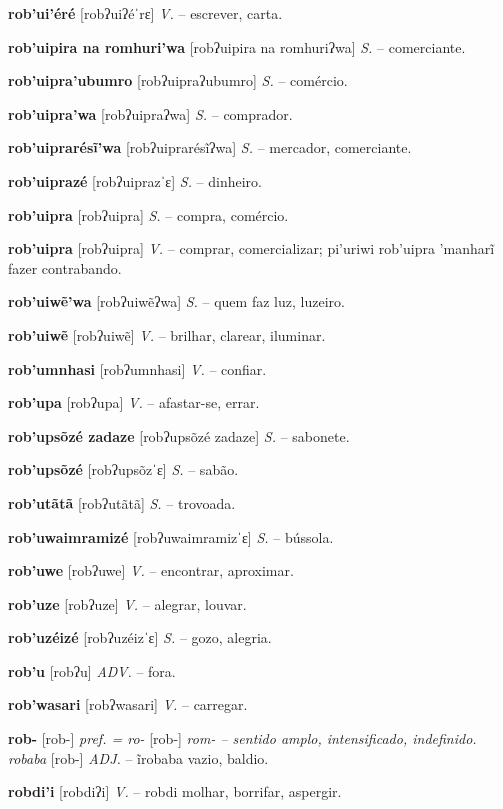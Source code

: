 \textbf{rob'ui'éré} [robʔuiʔéˈrɛ] \textit{V.} -- escrever, carta.

\textbf{rob'uipira na romhuri'wa} [robʔuipira na romhuriʔwa] \textit{S.} -- comerciante.

\textbf{rob'uipra'ubumro} [robʔuipraʔubumro] \textit{S.} -- comércio.

\textbf{rob'uipra'wa} [robʔuipraʔwa] \textit{S.} -- comprador.

\textbf{rob'uiprarésĩ'wa} [robʔuiprarésĩʔwa] \textit{S.} -- mercador, comerciante.

\textbf{rob'uiprazé} [robʔuiprazˈɛ] \textit{S.} -- dinheiro.

\textbf{rob'uipra} [robʔuipra] \textit{S.} -- compra, comércio.

\textbf{rob'uipra} [robʔuipra] \textit{V.} -- comprar, comercializar; pi'uriwi rob'uipra 'manharĩ fazer contrabando.

\textbf{rob'uiwẽ'wa} [robʔuiwẽʔwa] \textit{S.} -- quem faz luz, luzeiro.

\textbf{rob'uiwẽ} [robʔuiwẽ] \textit{V.} -- brilhar, clarear, iluminar.

\textbf{rob'umnhasi} [robʔumnhasi] \textit{V.} -- confiar.

\textbf{rob'upa} [robʔupa] \textit{V.} -- afastar-se, errar.

\textbf{rob'upsõzé zadaze} [robʔupsõzé zadaze] \textit{S.} -- sabonete.

\textbf{rob'upsõzé} [robʔupsõzˈɛ] \textit{S.} -- sabão.

\textbf{rob'utãtã} [robʔutãtã] \textit{S.} -- trovoada.

\textbf{rob'uwaimramizé} [robʔuwaimramizˈɛ] \textit{S.} -- bússola.

\textbf{rob'uwe} [robʔuwe] \textit{V.} -- encontrar, aproximar.

\textbf{rob'uze} [robʔuze] \textit{V.} -- alegrar, louvar.

\textbf{rob'uzéizé} [robʔuzéizˈɛ] \textit{S.} -- gozo, alegria.

\textbf{rob'u} [robʔu] \textit{ADV.} -- fora.

\textbf{rob'wasari} [robʔwasari] \textit{V.} -- carregar.

\textbf{rob-} [rob-] \textit{pref. = ro-} [rob-] \textit{rom- -- sentido amplo, intensificado, indefinido. robaba} [rob-] \textit{ADJ.} -- ĩrobaba vazio, baldio.

\textbf{robdi'i} [robdiʔi] \textit{V.} -- robdi molhar, borrifar, aspergir.

